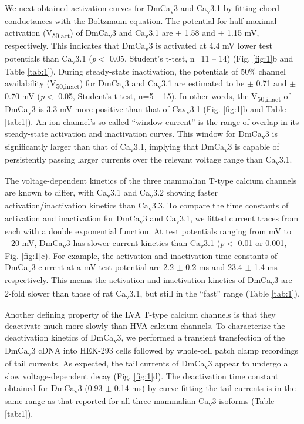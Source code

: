 We next obtained activation curves for DmCa\textsubscript{v}3 and Ca\textsubscript{v}3.1 by fitting chord conductances with the Boltzmann equation. The potential for half-maximal activation (V\textsubscript{50,act}) of DmCa\textsubscript{v}3 and Ca\textsubscript{v}3.1 are  $\pm$ 1.58 and  $\pm$ 1.15 mV, respectively. This indicates that DmCa\textsubscript{v}3 is activated at 4.4 mV lower test potentials than Ca\textsubscript{v}3.1 (\emph{p}$<$ 0.05, Student's t-test, n=11 -- 14) (Fig. \ref{fig:1}b and Table \ref{tab:1}).
During steady-state inactivation, the potentials of 50\% channel availability (V\textsubscript{50,inact}) for DmCa\textsubscript{v}3 and Ca\textsubscript{v}3.1 are estimated to be  $\pm$ 0.71 and  $\pm$ 0.70 mV (\emph{p}$<$ 0.05, Student's t-test, n=5 -- 15). In other words, the V\textsubscript{50,inact} of DmCa\textsubscript{v}3 is 3.3 mV more positive than that of Cav\textsubscript{v}3.1 (Fig. \ref{fig:1}b and Table \ref{tab:1}).
An ion channel's so-called ``window current'' is the range of overlap in its steady-state activation and inactivation curves. This window for DmCa\textsubscript{v}3 is significantly larger than that of Ca\textsubscript{v}3.1, implying that DmCa\textsubscript{v}3 is capable of persistently passing larger currents over the relevant voltage range than Ca\textsubscript{v}3.1.

The voltage-dependent kinetics of the three mammalian T-type calcium channels are known to differ, with Ca\textsubscript{v}3.1 and Ca\textsubscript{v}3.2 showing faster activation/inactivation kinetics than Ca\textsubscript{v}3.3\cite{klockner:1999aa}.
To compare the time constants of activation and inactivation for DmCa\textsubscript{v}3 and Ca\textsubscript{v}3.1, we fitted current traces from each with a double exponential function.
At test potentials ranging from  mV to +20 mV,  DmCa\textsubscript{v}3 has slower current kinetics than Ca\textsubscript{v}3.1 (\emph{p}$<$ 0.01 or 0.001, Fig. \ref{fig:1}c).
For example, the activation and inactivation time constants of DmCa\textsubscript{v}3 current at a  mV test potential are 2.2 $\pm$ 0.2 ms and 23.4 $\pm$ 1.4 ms respectively. This means the activation and inactivation kinetics of DmCa\textsubscript{v}3 are 2-fold slower than those of rat Ca\textsubscript{v}3.1, but still in the ``fast'' range (Table \ref{tab:1}).

Another defining property of the LVA T-type calcium channels is that they deactivate much more slowly than HVA calcium channels\cite{PerezReyes:1998gn,lee:1999aa,matteson:1986aa}. 
To characterize the deactivation kinetics of DmCa\textsubscript{v}3, we performed a transient transfection of the DmCa\textsubscript{v}3 cDNA into HEK-293 cells followed by whole-cell patch clamp recordings of tail currents.
As expected, the tail currents of DmCa\textsubscript{v}3 appear to undergo a slow voltage-dependent decay (Fig. \ref{fig:1}d).
The deactivation time constant obtained for DmCa\textsubscript{v}3 (0.93 $\pm$ 0.14 ms) by curve-fitting the tail currents is in the same range as that reported for all three mammalian Ca\textsubscript{v}3 isoforms (Table \ref{tab:1}). 

